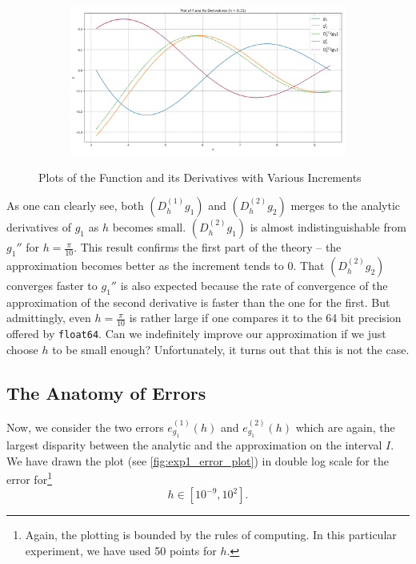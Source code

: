 \begin{figure}[h!]
\begin{subfigure}[b]{0.49\linewidth}
    \end{subfigure}
    \begin{subfigure}[b]{0.49\linewidth}
        \includegraphics[width=\linewidth]{graphics/plot_h/exp1_tiny_h.png}
    \end{subfigure}
    \caption{Plots of the Function and its Derivatives with Various Increments}
    \label{fig:exp1_h}
\end{figure}

As one can clearly see, both \((D^{(1)}_h g_1)\) and \((D^{(2)}_hg_2)\) merges to the analytic derivatives of \(g_1\) as \(h\) becomes small. \((D^{(2)}_h g_1)\) is almost indistinguishable from \(g_1''\) for \(h = \frac{\pi}{10}\). This result confirms the first part of the theory -- the approximation becomes better as the increment tends to \(0\). That \((D^{(2)}_h g_2)\) converges faster to \(g_1''\) is also expected because the rate of convergence of the approximation of the second derivative is faster than the one for the first. But admittingly, even \(h = \frac{\pi}{10}\) is rather large if one compares it to the 64 bit precision offered by \texttt{float64}. Can we indefinitely improve our approximation if we just choose \(h\) to be small enough? Unfortunately, it turns out that this is not the case.

\subsection{The Anatomy of Errors}\label{cha:error}

Now, we consider the two errors \(e_{g_1}^{(1)}(h)\) and \(e_{g_1}^{(2)}(h)\) which are again, the largest disparity between the analytic and the approximation on the interval \(I\). We have drawn the plot (see \ref{fig:exp1_error_plot}) in double log scale for the error for\footnote{Again, the plotting is bounded by the rules of computing. In this particular experiment, we have used 50 points for \(h\).}
\[h \in [10^{-9}, 10^2] \text{.} \]

